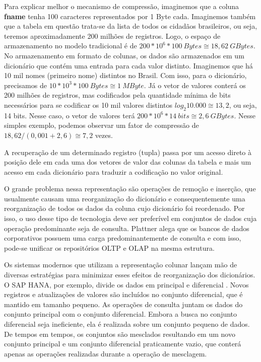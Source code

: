 Para explicar melhor o mecanismo de compressão, imaginemos que a coluna \textbf{fname} tenha 
100 caracteres representados por 1 Byte cada. Imaginemos também que a tabela em questão trata-se 
da lista de todos os cidadãos brasileiros, ou seja, teremos aproximadamente 200 milhões de registros. 
Logo, o espaço de armazenamento no modelo tradicional é de $200*10^6 * 100~Bytes \cong 18,62~GBytes$. 
No armazenamento em formato de colunas, os dados são armazenados em um dicionário que contém uma 
entrada para cada valor distinto. Imaginemos que há 10 mil nomes (primeiro nome) distintos no Brasil. 
Com isso, para o dicionário, precisamos de $10*10^3 * 100~Bytes \cong 1~MByte$. Já o vetor de 
valores conterá os 200 milhões de registros, mas codificados pela quantidade mínima de bits 
necessários para se codificar os 10 mil valores distintos $log_2 10.000 \cong 13,2$, ou seja, 
14 bits. Nesse caso, o vetor de valores terá $200*10^6 * 14~bits \cong 2,6~GBytes$. Nesse simples 
exemplo, podemos observar um fator de compressão de $18,62 / (0,001 + 2,6) \cong 7,2$ vezes.

A recuperação de um determinado registro (tupla) passa por um acesso direto à posição dele em 
cada uma dos vetores de valor das colunas da tabela e mais um acesso em cada dicionário para traduzir 
a codificação no valor original.

O grande problema nessa representação são operações de remoção e inserção, que usualmente causam uma 
reorganização do dicionário e consequentemente uma reorganização de todos os dados da coluna cujo 
dicionário foi reordenado. Por isso, o uso desse tipo de tecnologia deve ser preferível em conjuntos 
de dados cuja operação predominante seja de consulta. Plattner \cite{plattner2009common} alega que 
os bancos de dados corporativos possuem uma carga predominantemente de consulta e com isso, 
pode-se unificar os repositórios OLTP e OLAP na mesma estrutura. 

Os sistemas modernos que utilizam a representação colunar lançam mão de diversas estratégias para 
minimizar esses efeitos de reorganização dos dicionários. O SAP HANA, por exemplo, divide os dados 
em principal e diferencial \cite{plattner2012memory}. Novos registros e atualizações de valores são 
incluídos no conjunto diferencial, que é mantido em tamanho pequeno. As operações de consulta juntam 
os dados do conjunto principal com o conjunto diferencial. Embora a busca no conjunto diferencial seja 
ineficiente, ela é realizada sobre um conjunto pequeno de dados. De tempos em tempos, os conjuntos são 
mesclados resultando em um novo conjunto principal e um conjunto diferencial praticamente vazio, que 
conterá apenas as operações realizadas durante a operação de mesclagem.

